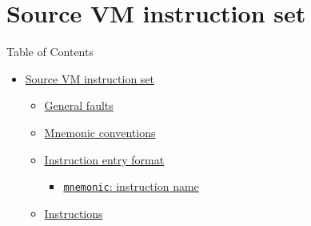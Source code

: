 \documentclass[11pt]{article}
\author{koo}
\date{\today}
\title{}
\begin{document}
\tableofcontents

\label{orgabf1b1f}

\label{org91c3f94}

\section{Source VM instruction set}
\label{sec:orgdf5f0e0}
\label{orga35b075}

\label{orgaf84f79}
Table of Contents

\begin{itemize}
\item \hyperref[sec:orgdf5f0e0]{Source VM instruction set}

\begin{itemize}
\item \hyperref[sec:orgd013882]{General faults}
\item \hyperref[sec:org6c2c333]{Mnemonic conventions}
\item \hyperref[sec:org6af44d0]{Instruction entry format}

\begin{itemize}
\item \hyperref[sec:org91c15ea]{\texttt{mnemonic}: instruction name}
\end{itemize}

\item \hyperref[sec:org33d7595]{Instructions}


\end{itemize}
\end{itemize}
\end{document}
